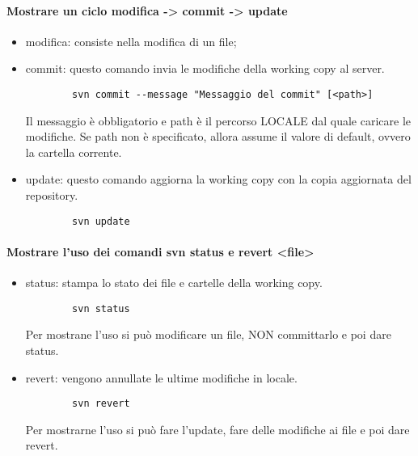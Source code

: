 \documentclass[a4paper]{article}
\begin{document}
	\paragraph{Mostrare un ciclo modifica -> commit -> update}
	\begin{itemize}
		\item modifica: consiste nella modifica di un file;
		\item commit: questo comando invia le modifiche della working copy al server.\begin{verbatim}
		svn commit --message "Messaggio del commit" [<path>]
		\end{verbatim}
		Il messaggio è obbligatorio e path è il percorso LOCALE dal quale caricare le modifiche. Se path non è specificato, allora assume il valore di default, ovvero la cartella corrente.
		\item update: questo comando aggiorna la working copy con la copia aggiornata del repository.
		\begin{verbatim}
		svn update
		\end{verbatim}
	\end{itemize}
	
	\paragraph{Mostrare l'uso dei comandi svn status e revert <file>}
	\begin{itemize}
		\item status: stampa lo stato dei file e cartelle della working copy.
		\begin{verbatim}
		svn status
		\end{verbatim}
		Per mostrane l'uso si può modificare un file, NON committarlo e poi dare status.
		\item revert: vengono annullate le ultime modifiche in locale.
		\begin{verbatim}
		svn revert
		\end{verbatim}
		Per mostrarne l'uso si può fare l'update, fare delle modifiche ai file e poi dare revert.
	\end{itemize}
\end{document}
